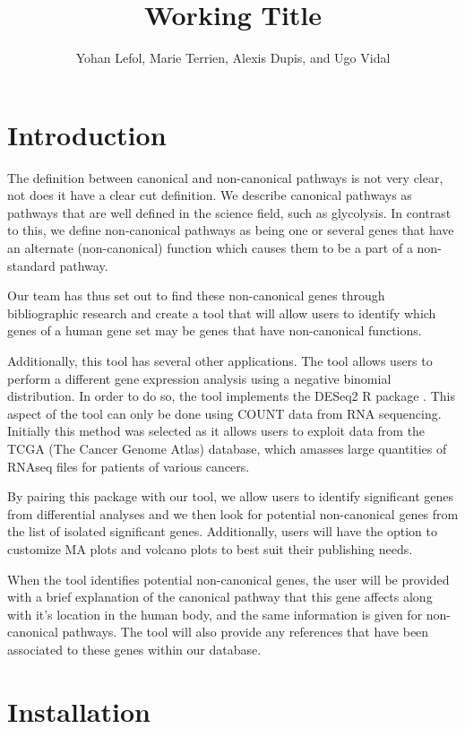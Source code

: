 \documentclass[11pt]{article}
\author{Yohan Lefol, Marie Terrien, Alexis Dupis, and Ugo Vidal}
\title{Working Title}
\begin{document}
\maketitle

\section{Introduction \label{intro}}
The definition between canonical and non-canonical pathways is not very clear, not does it have a clear cut definition.
We describe canonical pathways as pathways that are well defined in the science field, such as glycolysis. In contrast to this, we define non-canonical pathways as being one or several genes that have an alternate (non-canonical) function which causes them to be a part of a non-standard pathway.

Our team has thus set out to find these non-canonical genes through bibliographic research and create a tool that will allow users to identify which genes of a human gene set may be genes that have non-canonical functions.

Additionally, this tool has several other applications. The tool allows users to perform a different gene expression analysis using a negative binomial distribution. In order to do so, the tool implements the DESeq2 R package \cite{love2014moderated}. This aspect of the tool can only be done using COUNT data  from RNA sequencing. Initially this method was selected as it allows users to exploit data from the TCGA (The Cancer Genome Atlas) database, which amasses large quantities of RNAseq files for patients of various cancers.

By pairing this package with our tool, we allow users to identify significant genes from differential analyses and we then look for potential non-canonical genes from the list of isolated significant genes. Additionally, users will have the option to customize MA plots and volcano plots to best suit their publishing needs.

When the tool identifies potential non-canonical genes, the user will be provided with a brief explanation of the canonical pathway that this gene affects along with it's location in the human body, and the same information is given for non-canonical pathways. The tool will also provide any references that have been associated to these genes within our database.

\section{Installation \label{installation}}
\end{document}
